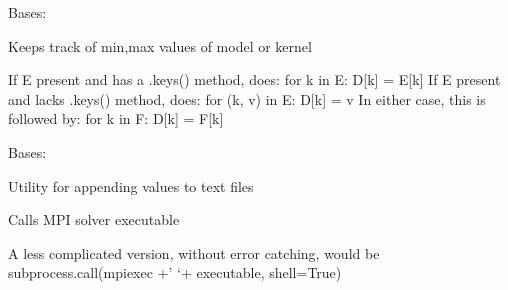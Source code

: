 \documentclass[letterpaper,10pt,english]{sphinxmanual}
\begin{document}

\begin{fulllineitems}
\label{\detokenize{ref/seisflows.tools:seisflows.tools.seismic.Minmax}}
Bases: 

Keeps track of min,max values of model or kernel

\begin{fulllineitems}
\label{\detokenize{ref/seisflows.tools:seisflows.tools.seismic.Minmax.update}}
If E present and has a .keys() method, does:     for k in E: D{[}k{]} = E{[}k{]}
If E present and lacks .keys() method, does:     for (k, v) in E: D{[}k{]} = v
In either case, this is followed by: for k in F: D{[}k{]} = F{[}k{]}

\end{fulllineitems}


\end{fulllineitems}


\begin{fulllineitems}
\label{\detokenize{ref/seisflows.tools:seisflows.tools.seismic.Writer}}
Bases: 

Utility for appending values to text files

\end{fulllineitems}


\begin{fulllineitems}
\label{\detokenize{ref/seisflows.tools:seisflows.tools.seismic.call_solver}}
Calls MPI solver executable

A less complicated version, without error catching, would be
subprocess.call(mpiexec +’ ‘+ executable, shell=True)

\end{fulllineitems}
\end{document}
